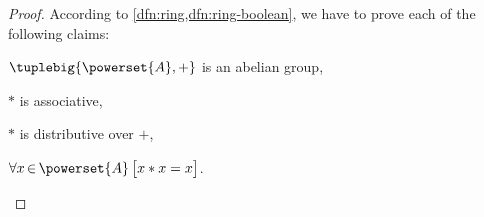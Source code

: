 \begin{proof}
    According to \cref{dfn:ring,dfn:ring-boolean}, we have to prove each of the following claims:
    \begin{enumerate*}[label=(\roman*)]
        \item \( \tuplebig{\powerset{A},+} \) is an abelian group, \label{enum:ring-power-set-forms-a-boolean-ring-claim1}
        \item \( \ast \) is associative, \label{enum:ring-power-set-forms-a-boolean-ring-claim2}
        \item \( \ast \) is distributive over \( + \), \label{enum:ring-power-set-forms-a-boolean-ring-claim3}
        \item \( \forall x\,{\in}\,\powerset{A} \, \big[ x \ast x = x \big]\). \label{enum:ring-power-set-forms-a-boolean-ring-claim4}
    \end{enumerate*}


\end{proof}
